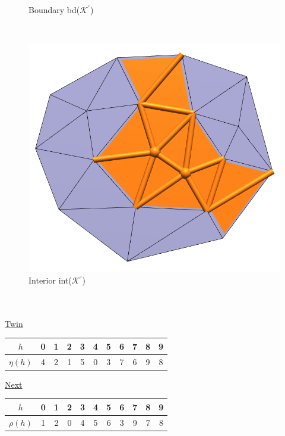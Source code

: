 \documentclass{article}
\begin{document}
\begin{table}[ht]
\begin{subfigure}{0.45\columnwidth}
    \caption{Boundary bd($\mathcal{K}^\prime$)}
    \end{subfigure}\\[1em]
    \begin{subfigure}{0.45\columnwidth}
    \includegraphics[width=\linewidth]{figs/2_9_int.png}
    \caption{Interior int($\mathcal{K}^\prime$)}
    \end{subfigure}
\end{table}%



\vspace{1.8cm}
\\\\


\underline{Twin}
\begin{center}
    \begin{tabular}{ c|c|c|c|c|c|c|c|c|c|c } 
        $h$&0&1&2&3&4&5&6&7&8&9\\
        \hline
        $\eta(h)$&4&2&1&5&0&3&7&6&9&8
    \end{tabular}
\end{center}

\underline{Next}
\begin{center}
    \begin{tabular}{ c|c|c|c|c|c|c|c|c|c|c } 
        $h$&0&1&2&3&4&5&6&7&8&9\\
        \hline
        $\rho(h)$&1&2&0&4&5&6&3&9&7&8
    \end{tabular}
\end{center}
\end{document}

